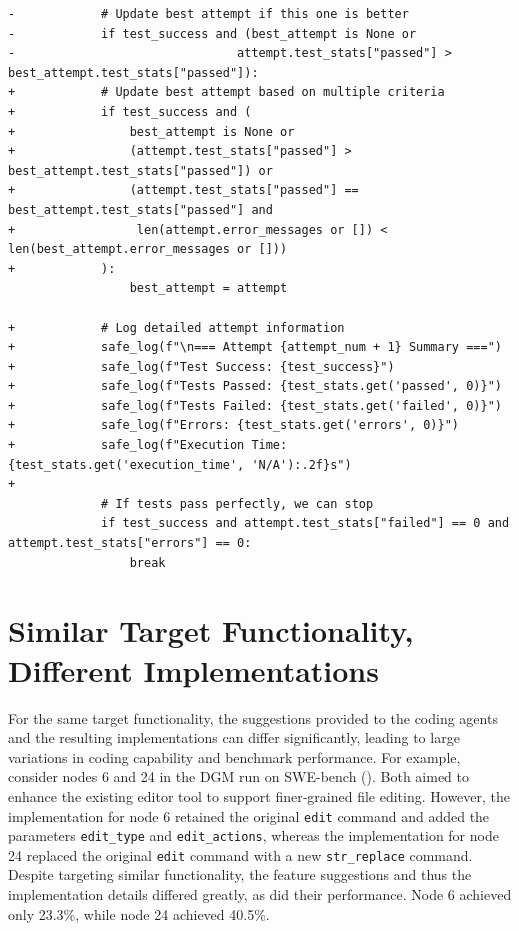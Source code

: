 \documentclass{article} %
\begin{document}
\begin{lstlisting}[style=diffstyle]
-            # Update best attempt if this one is better
-            if test_success and (best_attempt is None or 
-                               attempt.test_stats["passed"] > best_attempt.test_stats["passed"]):
+            # Update best attempt based on multiple criteria
+            if test_success and (
+                best_attempt is None or
+                (attempt.test_stats["passed"] > best_attempt.test_stats["passed"]) or
+                (attempt.test_stats["passed"] == best_attempt.test_stats["passed"] and
+                 len(attempt.error_messages or []) < len(best_attempt.error_messages or []))
+            ):
                 best_attempt = attempt
             
+            # Log detailed attempt information
+            safe_log(f"\n=== Attempt {attempt_num + 1} Summary ===")
+            safe_log(f"Test Success: {test_success}")
+            safe_log(f"Tests Passed: {test_stats.get('passed', 0)}")
+            safe_log(f"Tests Failed: {test_stats.get('failed', 0)}")
+            safe_log(f"Errors: {test_stats.get('errors', 0)}")
+            safe_log(f"Execution Time: {test_stats.get('execution_time', 'N/A'):.2f}s")
+            
             # If tests pass perfectly, we can stop
             if test_success and attempt.test_stats["failed"] == 0 and attempt.test_stats["errors"] == 0:
                 break
\end{lstlisting}


\section{Similar Target Functionality, Different Implementations}
\label{app:supp-dgm-diffimpl}
For the same target functionality, the suggestions provided to the coding agents and the resulting implementations can differ significantly, leading to large variations in coding capability and benchmark performance. For example, consider nodes 6 and 24 in the DGM run on SWE-bench (). Both aimed to enhance the existing editor tool to support finer‑grained file editing. However, the implementation for node 6 retained the original \texttt{edit} command and added the parameters \texttt{edit\_type} and \texttt{edit\_actions}, whereas the implementation for node 24 replaced the original \texttt{edit} command with a new \texttt{str\_replace} command. Despite targeting similar functionality, the feature suggestions and thus the implementation details differed greatly, as did their performance. Node 6 achieved only 23.3\%, while node 24 achieved 40.5\%.
\end{document}
